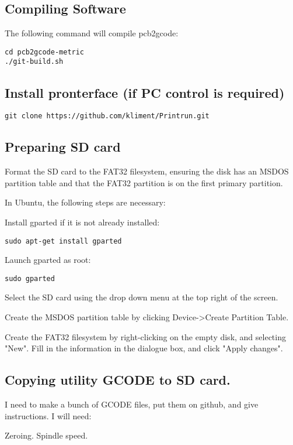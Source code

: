 \documentclass[a4paper,11pt]{article}  %
\begin{document}
\subsection{Compiling Software}
The following command will compile pcb2gcode:
\begin{lstlisting}
cd pcb2gcode-metric
./git-build.sh
\end{lstlisting}

\subsection{Install pronterface (if PC control is required)}
\begin{lstlisting}
git clone https://github.com/kliment/Printrun.git
\end{lstlisting}


\subsection{Preparing SD card}
Format the SD card to the FAT32 filesystem, ensuring the disk has an
MSDOS partition table and that the FAT32 partition is on the first
primary partition.

In Ubuntu, the following steps are necessary:

Install gparted if it is not already installed:

\begin{lstlisting}
sudo apt-get install gparted
\end{lstlisting}

Launch gparted as root:
\begin{lstlisting}
sudo gparted
\end{lstlisting}

Select the SD card using the drop down menu at the top right of the
screen.

Create the MSDOS partition table by clicking Device-\textgreater Create Partition Table.

Create the FAT32 filesystem by right-clicking on the empty disk, and selecting "New". 
Fill in the information in the dialogue box, and click "Apply changes". 

\subsection{Copying utility GCODE to SD card.}
I need to make a bunch of GCODE files, put them on github, and give instructions.
I will need:

Zeroing.
Spindle speed.
\end{document}
